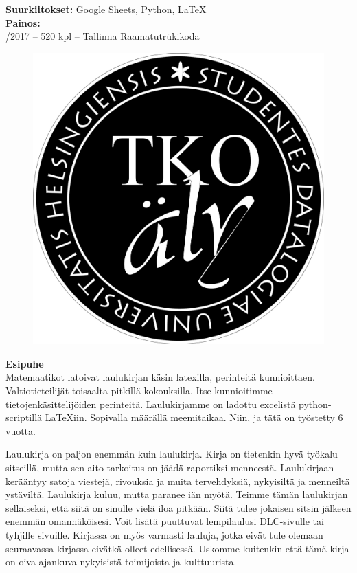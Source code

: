 \noindent
\textbf{Suurkiitokset:} Google Sheets, Python, \LaTeX \\

\noindent
\textbf{Painos:} \\
/2017 -- 520 kpl -- Tallinna Raamatutrükikoda \\

\pagebreak

\begin{figure}[h!]
\centering
\includegraphics[scale=0.4]{graphics/logo.png}
\end{figure}

\pagebreak

\null\newpage

\textbf{Esipuhe}
\\

Matemaatikot latoivat laulukirjan käsin latexilla, perinteitä kunnioittaen.
Valtiotieteilijät toisaalta pitkillä kokouksilla. Itse kunnioitimme
tietojenkäsittelijöiden perinteitä. Laulu\-kirjamme on ladottu excelistä
python-scriptillä \LaTeX{}iin. Sopivalla määrällä mee\-mi\-taikaa. Niin, ja tätä on työstetty 6 vuotta.

Laulukirja on paljon enemmän kuin laulukirja. Kirja on tieten\-kin hyvä työkalu
sitseillä, mutta sen aito tarkoitus on jäädä ra\-por\-tik\-si menneestä. Laulukirjaan
kerääntyy satoja viestejä, rivouksia ja muita tervehdyksiä, nykyisiltä ja
menneiltä ystäviltä. Laulukirja kuluu, mutta paranee iän myötä. Teimme tämän
laulukirjan sel\-lai\-sek\-si, että siitä on sinulle vielä iloa pitkään. Siitä tulee
jokaisen sitsin jälkeen enemmän omannäköisesi. Voit lisätä puuttuvat lempi\-laulusi DLC-sivulle tai tyhjille sivuille.
Kirjassa on myös varmasti lauluja, jotka eivät tule olemaan seuraavassa
kirjassa eivätkä olleet edellisessä. Uskomme kuitenkin että tämä kirja on oiva
ajankuva nykyisistä toimijoista ja kulttuurista.

